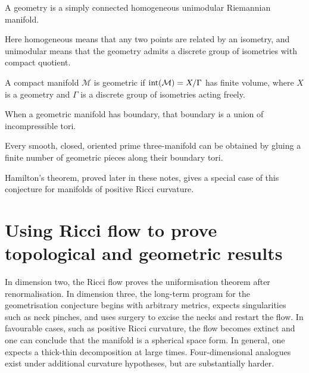 \begin{definition}
\label{topping-intro-geometry}
A geometry is a simply connected homogeneous unimodular Riemannian manifold.
\end{definition}

Here homogeneous means that any two points are related by an isometry, and
unimodular means that the geometry admits a discrete group of isometries with
compact quotient.

\begin{definition}
\label{topping-intro-geometric-manifold}
A compact manifold $\mathcal M$ is geometric if $\operatorname{int}(\mathcal M)=X/\Gamma$
has finite volume, where $X$ is a geometry and $\Gamma$ is a discrete group of
isometries acting freely.
\end{definition}

When a geometric manifold has boundary, that boundary is a union of
incompressible tori.

\begin{conjecture}
\label{topping-intro-thurston-geometrization}
Every smooth, closed, oriented prime three-manifold can be obtained by gluing a
finite number of geometric pieces along their boundary tori.
\end{conjecture}

Hamilton's theorem, proved later in these notes, gives a special case of this
conjecture for manifolds of positive Ricci curvature.

\section{Using Ricci flow to prove topological and geometric results}

In dimension two, the Ricci flow proves the uniformisation theorem after
renormalisation. In dimension three, the long-term program for the geometrisation
conjecture begins with arbitrary metrics, expects singularities such as neck
pinches, and uses surgery to excise the necks and restart the flow. In
favourable cases, such as positive Ricci curvature, the flow becomes extinct
and one can conclude that the manifold is a spherical space form. In general,
one expects a thick-thin decomposition at large times. Four-dimensional analogues
exist under additional curvature hypotheses, but are substantially harder.
